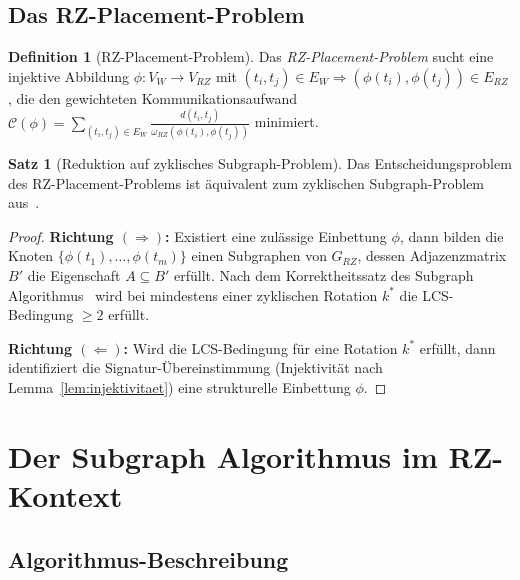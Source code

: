 ﻿\documentclass[a4paper,12pt]{article}
\theoremstyle{definition}
\newtheorem{definition}{Definition}
\newtheorem{satz}{Satz}
\begin{document}
\subsection{Das RZ-Placement-Problem}

\begin{definition}[RZ-Placement-Problem]
  \label{def:placement}
  Das \emph{RZ-Placement-Problem} sucht eine injektive Abbildung $\phi: V_W \to V_{RZ}$ mit
  $(t_i, t_j) \in E_W \Rightarrow (\phi(t_i), \phi(t_j)) \in E_{RZ}$,
  die den gewichteten Kommunikationsaufwand
  $\mathcal{C}(\phi) = \sum_{(t_i,t_j) \in E_W} \frac{d(t_i, t_j)}{\omega_{RZ}(\phi(t_i), \phi(t_j))}$
  minimiert.
\end{definition}

\begin{satz}[Reduktion auf zyklisches Subgraph-Problem]
  \label{satz:reduktion}
  Das Entscheidungsproblem des RZ-Placement-Problems ist \"{a}quivalent zum zyklischen Subgraph-Problem aus~\cite{epp2026subgraph}.
\end{satz}

\begin{proof}
  \textbf{Richtung $(\Rightarrow)$:} Existiert eine zul\"{a}ssige Einbettung $\phi$, dann bilden die Knoten $\{\phi(t_1), \ldots, \phi(t_m)\}$ einen Subgraphen von $G_{RZ}$, dessen Adjazenzmatrix $B'$ die Eigenschaft $A \subseteq B'$ erf\"{u}llt.
  Nach dem Korrektheitssatz des Subgraph Algorithmus~\cite{epp2026subgraph} wird bei mindestens einer zyklischen Rotation $k^*$ die LCS-Bedingung $\geq 2$ erf\"{u}llt.

  \textbf{Richtung $(\Leftarrow)$:} Wird die LCS-Bedingung f\"{u}r eine Rotation $k^*$ erf\"{u}llt, dann identifiziert die Signatur-\"{U}bereinstimmung (Injektivit\"{a}t nach Lemma~\ref{lem:injektivitaet}) eine strukturelle Einbettung $\phi$.
\end{proof}

\section{Der Subgraph Algorithmus im RZ-Kontext}
\label{sec:algorithmus}

\subsection{Algorithmus-Beschreibung}
\end{document}
